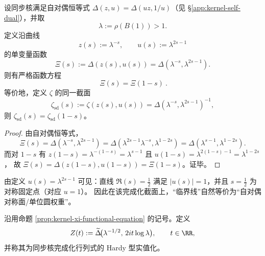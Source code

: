 \begin{proposition}[完成化行列式的函数方程]\label{prop:kernel-xi-functional-equation}
设同步核满足自对偶恒等式 $\Delta(z,u)=\Delta(uz,1/u)$（见 \S\ref{app:kernel-self-dual}），并取
\[
\lambda:=\rho(B(1))>1.
\]
定义沿曲线
\[
z(s):=\lambda^{-s},\qquad u(s):=\lambda^{2s-1}
\]
的单变量函数
\[
\Xi(s):=\Delta(z(s),u(s))=\Delta(\lambda^{-s},\lambda^{2s-1}).
\]
则有严格函数方程
\[
\boxed{\ \Xi(s)=\Xi(1-s)\ }.
\]
等价地，定义 $\zeta$ 的同一截面
\[
\zeta_{\mathrm{sd}}(s):=\zeta(z(s),u(s))=\Delta(\lambda^{-s},\lambda^{2s-1})^{-1},
\]
则 $\zeta_{\mathrm{sd}}(s)=\zeta_{\mathrm{sd}}(1-s)$。
\end{proposition}
\begin{proof}
由自对偶恒等式，
\[
\Xi(s)=\Delta(\lambda^{-s},\lambda^{2s-1})
=\Delta(\lambda^{2s-1}\lambda^{-s},\lambda^{1-2s})
=\Delta(\lambda^{s-1},\lambda^{1-2s}).
\]
而对 $1-s$ 有
\(
z(1-s)=\lambda^{-(1-s)}=\lambda^{s-1}
\)
且
\(
u(1-s)=\lambda^{2(1-s)-1}=\lambda^{1-2s}
\)，
故 $\Xi(s)=\Delta(z(1-s),u(1-s))=\Xi(1-s)$。证毕。
\end{proof}

\begin{remark}[临界线与对称固定点]\label{rem:kernel-critical-line-u1}
由定义 $u(s)=\lambda^{2s-1}$ 可见：直线 $\Re(s)=\tfrac12$ 满足 $|u(s)|=1$，并且 $s=\tfrac12$ 为对称固定点（对应 $u=1$）。
因此在该完成化截面上，“临界线”自然等价为“自对偶对称面/单位圆权重”。
\end{remark}

\begin{definition}\label{def:kernel-hardy-function}
沿用命题 \ref{prop:kernel-xi-functional-equation} 的记号。定义
$$
Z(t):=\widetilde{\Delta}\!\bigl(\lambda^{-1/2},\,2it\log\lambda\bigr),
\qquad t\in\RR,
$$
并称其为同步核完成化行列式的 Hardy 型实值化。
\end{definition}

